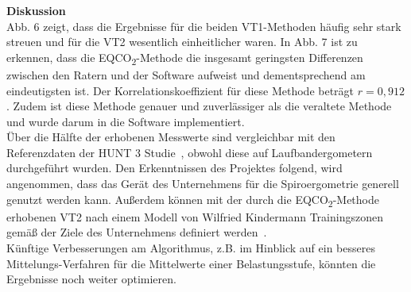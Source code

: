 \textbf{\Large Diskussion}\\

Abb. 6 zeigt, dass die Ergebnisse für die beiden VT1-Methoden häufig sehr stark streuen und für die VT2 wesentlich einheitlicher waren. In Abb. 7 ist zu erkennen, dass die EQCO\textsubscript{2}-Methode die insgesamt geringsten Differenzen zwischen den Ratern und der Software aufweist und dementsprechend am eindeutigsten ist. Der Korrelationskoeffizient für diese Methode beträgt $r = 0,912$. Zudem ist diese Methode genauer und zuverlässiger als die veraltete Methode und wurde darum in die Software implementiert.\\
Über die Hälfte der erhobenen Messwerte sind vergleichbar mit den Referenzdaten der HUNT 3 Studie~\cite{Loe.2014}, obwohl diese auf Laufbandergometern durchgeführt wurden. Den Erkenntnissen des Projektes folgend, wird angenommen, dass das Gerät des Unternehmens für die Spiroergometrie generell genutzt werden kann. Außerdem können mit der durch die EQCO\textsubscript{2}-Methode erhobenen VT2 nach einem Modell von Wilfried Kindermann Trainingszonen gemäß der Ziele des Unternehmens definiert werden~\cite{Kindermann.2004}.\\
Künftige Verbesserungen am Algorithmus, z.B. im Hinblick auf ein besseres Mittelungs-Verfahren für die Mittelwerte einer Belastungsstufe, könnten die Ergebnisse noch weiter optimieren.
